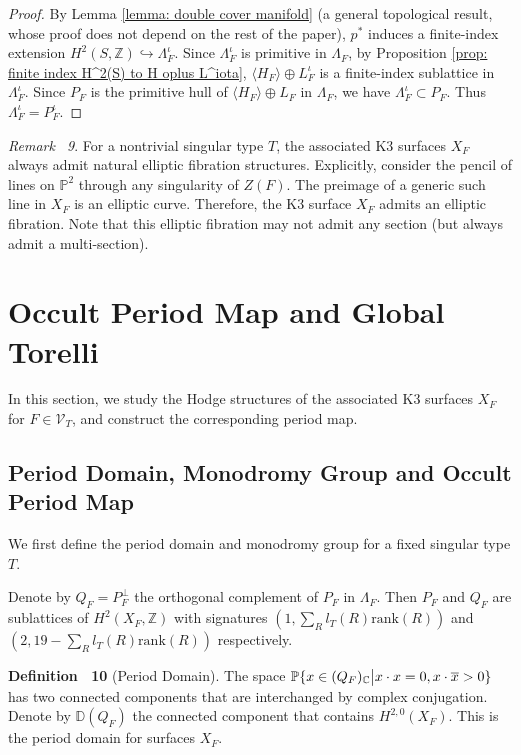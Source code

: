 \documentclass[
]{article}
\begin{document}
\emph{Proof.} By Lemma \ref{lemma: double cover manifold} (a general
topological result, whose proof does not depend on the rest of the
paper), \(p^*\) induces a finite-index extension
\(H^2(S,\mathbb{Z})\hookrightarrow \Lambda_F^\iota\). Since
\(\Lambda_F^\iota\) is primitive in \(\Lambda_F\), by Proposition
\ref{prop: finite index H^2(S) to H oplus L^iota},
\(\langle H_F \rangle\oplus L_F^{\iota}\) is a finite-index sublattice
in \(\Lambda_F^\iota\). Since \(P_F\) is the primitive hull of
\(\langle H_F \rangle\oplus L_F\) in \(\Lambda_F\), we have
\(\Lambda_F^\iota\subset P_F\). Thus \(\Lambda_F^\iota = P_F^\iota\).~◻

\emph{Remark~ 9}. For a nontrivial singular type \(T\), the associated
K3 surfaces \(X_F\) always admit natural elliptic fibration structures.
Explicitly, consider the pencil of lines on \(\mathbb{P}^2\) through any
singularity of \(Z(F)\). The preimage of a generic such line in \(X_F\)
is an elliptic curve. Therefore, the K3 surface \(X_F\) admits an
elliptic fibration. Note that this elliptic fibration may not admit any
section (but always admit a multi-section).

\section{Occult Period Map and Global
Torelli}\label{section:ux20periodux20map}

In this section, we study the Hodge structures of the associated K3
surfaces \(X_F\) for \(F\in\mathcal{V}_T\), and construct the
corresponding period map.

\subsection{Period Domain, Monodromy Group and Occult Period
Map}\label{subsection:ux20defineux20periodux20map}

We first define the period domain and monodromy group for a fixed
singular type \(T\).

Denote by \(Q_F=P_F^\perp\) the orthogonal complement of \(P_F\) in
\(\Lambda_F\). Then \(P_F\) and \(Q_F\) are sublattices of
\(H^2(X_F,\mathbb{Z})\) with signatures
\((1,\sum_R l_{T}(R)\mathrm{rank}(R))\) and
\((2,19-\sum_R l_{T}(R)\mathrm{rank}(R))\) respectively.

\textbf{Definition~ 10} (Period Domain). \label{defn: period domain} The
space
\(\mathbb{P}\{x\in (Q_F)_\mathbb{C} \big{|} x\cdot x=0, x\cdot \overline{x}>0 \}\)
has two connected components that are interchanged by complex
conjugation. Denote by \(\mathbb{D}(Q_F)\) the connected component that
contains \(H^{2,0}(X_F)\). This is the period domain for surfaces
\(X_F\).
\end{document}
